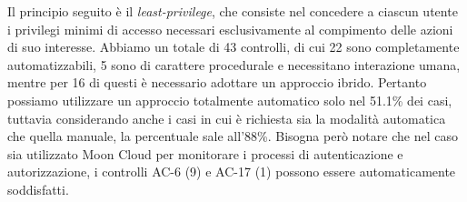 Il principio seguito è il \textit{least-privilege}, che consiste nel concedere a ciascun utente i privilegi minimi di accesso necessari esclusivamente al compimento delle azioni di suo interesse.
Abbiamo un totale di 43 controlli, di cui 22 sono completamente automatizzabili, 5 sono di carattere procedurale e necessitano interazione umana, mentre per 16 di questi è necessario adottare un approccio ibrido.
Pertanto possiamo utilizzare un approccio totalmente automatico solo nel 51.1\%  dei casi, tuttavia considerando anche i casi in cui è richiesta sia la modalità automatica che quella manuale, la percentuale sale all'88\%.
Bisogna però notare che nel caso sia utilizzato Moon Cloud per monitorare i processi di autenticazione e autorizzazione, i controlli AC-6 (9) e AC-17 (1) possono essere automaticamente soddisfatti.
